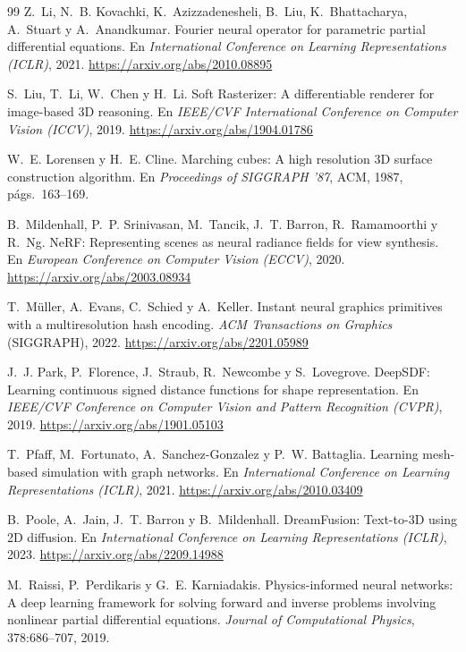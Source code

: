 \begin{thebibliography}{99}
Z.~Li, N.~B. Kovachki, K.~Azizzadenesheli, B.~Liu, K.~Bhattacharya, A.~Stuart y A.~Anandkumar.
\newblock Fourier neural operator for parametric partial differential equations.
\newblock En \emph{International Conference on Learning Representations (ICLR)}, 2021.
\newblock \url{https://arxiv.org/abs/2010.08895}

S.~Liu, T.~Li, W.~Chen y H.~Li.
\newblock Soft Rasterizer: A differentiable renderer for image-based 3D reasoning.
\newblock En \emph{IEEE/CVF International Conference on Computer Vision (ICCV)}, 2019.
\newblock \url{https://arxiv.org/abs/1904.01786}

W.~E. Lorensen y H.~E. Cline.
\newblock Marching cubes: A high resolution 3D surface construction algorithm.
\newblock En \emph{Proceedings of SIGGRAPH '87}, ACM, 1987, págs.~163--169.

B.~Mildenhall, P.~P. Srinivasan, M.~Tancik, J.~T. Barron, R.~Ramamoorthi y R.~Ng.
\newblock NeRF: Representing scenes as neural radiance fields for view synthesis.
\newblock En \emph{European Conference on Computer Vision (ECCV)}, 2020.
\newblock \url{https://arxiv.org/abs/2003.08934}

T.~Müller, A.~Evans, C.~Schied y A.~Keller.
\newblock Instant neural graphics primitives with a multiresolution hash encoding.
\newblock \emph{ACM Transactions on Graphics} (SIGGRAPH), 2022.
\newblock \url{https://arxiv.org/abs/2201.05989}

J.~J. Park, P.~Florence, J.~Straub, R.~Newcombe y S.~Lovegrove.
\newblock DeepSDF: Learning continuous signed distance functions for shape representation.
\newblock En \emph{IEEE/CVF Conference on Computer Vision and Pattern Recognition (CVPR)}, 2019.
\newblock \url{https://arxiv.org/abs/1901.05103}

T.~Pfaff, M.~Fortunato, A.~Sanchez-Gonzalez y P.~W. Battaglia.
\newblock Learning mesh-based simulation with graph networks.
\newblock En \emph{International Conference on Learning Representations (ICLR)}, 2021.
\newblock \url{https://arxiv.org/abs/2010.03409}

B.~Poole, A.~Jain, J.~T. Barron y B.~Mildenhall.
\newblock DreamFusion: Text-to-3D using 2D diffusion.
\newblock En \emph{International Conference on Learning Representations (ICLR)}, 2023.
\newblock \url{https://arxiv.org/abs/2209.14988}

M.~Raissi, P.~Perdikaris y G.~E. Karniadakis.
\newblock Physics-informed neural networks: A deep learning framework for solving forward and inverse problems involving nonlinear partial differential equations.
\newblock \emph{Journal of Computational Physics}, 378:686--707, 2019.


\end{thebibliography}
